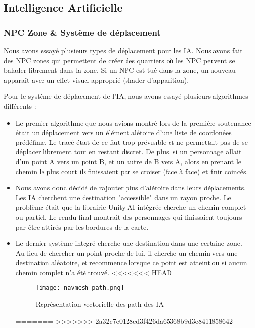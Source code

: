 \subsection{Intelligence Artificielle}
    \subsubsection{NPC Zone \& Système de déplacement}
    Nous avons essayé plusieurs types de déplacement pour les IA. Nous avons fait des NPC zones qui permettent de créer des quartiers
    où les NPC peuvent se balader librement dans la zone. Si un NPC est tué dans la zone, un nouveau apparaît avec un effet visuel 
    approprié (shader d'apparition).
    \newline
    
    Pour le système de déplacement de l'IA,
    nous avons essayé plusieurs algorithmes différents :\newline
    
    \begin{itemize}
        \item Le premier algorithme que nous avions montré lors de la première soutenance
        était un déplacement vers un élément alétoire d'une liste de coordonées prédéfinie.
        Le tracé était de ce fait trop prévisible et ne permettait pas de se déplacer librement tout en restant discret.
        De plus, si un personnage allait d'un point A vers un point B, et un autre de B vers A,
        alors en prenant le chemin le plus court ils finissaient par se croiser (face à face) et finir coincés.
        \newline
        \item  Nous avons donc décidé de rajouter plus d'alétoire dans leurs déplacements.
        Les IA cherchent une destination "accessible" dans un rayon proche.
        Le problème était que la librairie Unity AI intégrée cherche un chemin complet ou partiel.
        Le rendu final montrait des personnages qui finissaient toujours par être attirés par les bordures de la carte.
        \newline

        \item  Le dernier système intégré cherche une destination dans une certaine zone.
        Au lieu de chercher un point proche de lui, il cherche un chemin vers une destination aléatoire, 
        et recommence lorsque ce point est atteint ou si aucun chemin complet n'a été trouvé.
<<<<<<< HEAD
        
        \begin{figure}[hbt!]
            \centering
            \texttt{[image: navmesh\_path.png]}
            \caption{Représentation vectorielle des path des IA}
        \end{figure}
    

=======
>>>>>>> 2a32c7e0128cd3f426da65368b9d3e8411858642

    \end{itemize}
    
